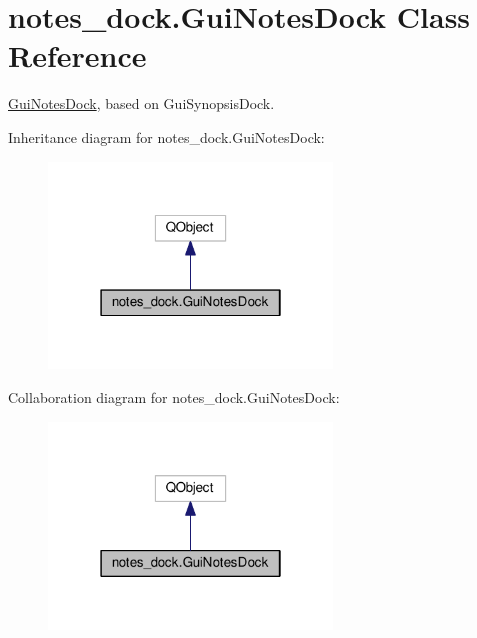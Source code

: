 \hypertarget{classnotes__dock_1_1_gui_notes_dock}{}\section{notes\+\_\+dock.\+Gui\+Notes\+Dock Class Reference}
\label{classnotes__dock_1_1_gui_notes_dock}


\hyperlink{classnotes__dock_1_1_gui_notes_dock}{Gui\+Notes\+Dock}, based on Gui\+Synopsis\+Dock.  




Inheritance diagram for notes\+\_\+dock.\+Gui\+Notes\+Dock\+:\nopagebreak
\begin{figure}[H]
\begin{center}
\leavevmode
\includegraphics[width=214pt]{classnotes__dock_1_1_gui_notes_dock__inherit__graph}
\end{center}
\end{figure}


Collaboration diagram for notes\+\_\+dock.\+Gui\+Notes\+Dock\+:\nopagebreak
\begin{figure}[H]
\begin{center}
\leavevmode
\includegraphics[width=214pt]{classnotes__dock_1_1_gui_notes_dock__coll__graph}
\end{center}
\end{figure}
